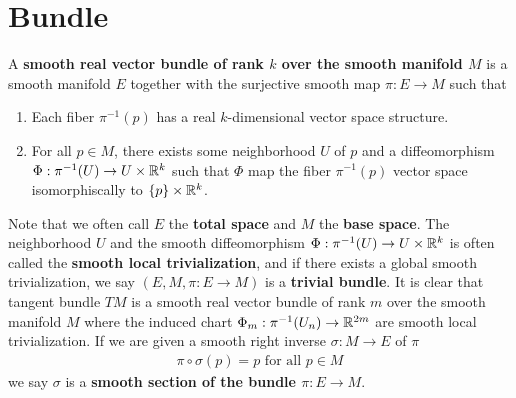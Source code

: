 \documentclass{report}
\begin{document}
\section{Bundle}
\begin{mdframed}
A \textbf{smooth real vector bundle of rank $k$ over the smooth manifold $M$} is a smooth manifold $E$ together with the surjective smooth map  $\pi : E\rightarrow M$ such that 
\begin{enumerate}[label=(\alph*)]
  \item Each fiber $\pi^{-1}(p)$ has a real $k$-dimensional vector space structure. 
  \item For all $p \in M$, there exists some neighborhood $U$ of  $p$ and a diffeomorphism  $\Phi:\pi^{-1}(U)\rightarrow U\times \mathbb{R}^k$ such that $\Phi$ map the fiber $\pi^{-1}(p)$ vector space isomorphiscally to $\{ p \}\times \mathbb{R}^k$. 
\end{enumerate}
Note that we often call $E$ the  \textbf{total space} and $M$ the  \textbf{base space}. The neighborhood $U$ and the smooth diffeomorphism $\Phi:\pi^{-1}(U)\rightarrow U\times \mathbb{R}^k$ is often called the \textbf{smooth local trivialization}, and if there exists a global smooth trivialization, we say $(E,M,\pi:E\rightarrow M)$ is a \textbf{trivial bundle}. It is clear that tangent bundle $TM$ is a smooth real vector bundle of rank  $m$ over the smooth manifold  $M$ where the induced chart  $\Phi_m :\pi^{-1}(U_n)\rightarrow \mathbb{R}^{2m}$ are smooth local trivialization. If we are given a smooth right inverse  $\sigma:M\rightarrow E$ of $\pi$
\begin{align*}
\pi \circ \sigma (p)=p\text{ for all }p \in M
\end{align*}
we say $\sigma$ is a \textbf{smooth section of the bundle $\pi:E\rightarrow M$}. 
\end{mdframed}
\end{document}
